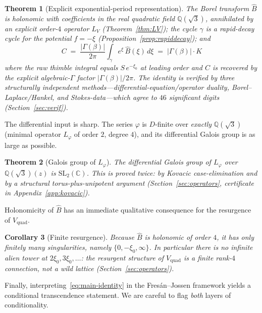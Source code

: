 \documentclass[11pt,reqno]{amsart}
\renewcommand{\_}{\vquadorigunderscore\allowbreak}
\theoremstyle{plain}
\newtheorem{theorem}{Theorem}[section]
\newtheorem{corollary}[theorem]{Corollary}
\theoremstyle{definition}
\newcommand{\Vquad}{V_{\mathrm{quad}}}
\newcommand{\Bhat}{\widehat{B}}
\newcommand{\Lphi}{L_{\varphi}}
\newcommand{\LV}{L_{V}}
\newcommand{\Qsqrt}{\mathbb{Q}(\sqrt3)}
\newcommand{\xizero}{\xi_0}
\newcommand{\SL}{\mathrm{SL}}
\providecommand{\C}{}\renewcommand{\C}{C}
\begin{document}
\begin{theorem}[Explicit exponential-period representation]\label{thm:main}
The Borel transform $\Bhat$ is holonomic with coefficients in the real quadratic field
$\Qsqrt$, annihilated by an explicit order-$4$ operator $\LV$ (Theorem~\ref{thm:LV}); the
cycle $\gamma$ is a rapid-decay cycle for the potential $f=-\xi$
(Proposition~\ref{prop:rapiddecay}); and
\begin{equation}\label{eq:main-identity}
  \boxed{\;\C\;=\;\frac{\lvert\Gamma(\beta)\rvert}{2\pi}\int_{\gamma} e^{\xi}\,\Bhat(\xi)\,d\xi
  \;=\;\lvert\Gamma(\beta)\rvert\cdot K\;}
\end{equation}
where the raw thimble integral equals $S\,e^{-\xizero}$ at leading order and $\C$ is recovered
by the explicit algebraic-$\Gamma$ factor $\lvert\Gamma(\beta)\rvert/2\pi$. The identity is
verified by three structurally independent methods---differential-equation/operator duality,
Borel--Laplace/Hankel, and Stokes-data---which agree to $46$ significant digits
(Section~\ref{sec:verif}).
\end{theorem}

The differential input is sharp. The series $\varphi$ is $D$-finite over \emph{exactly} $\Qsqrt$
(minimal operator $\Lphi$ of order $2$, degree $4$), and its differential Galois group is as
large as possible.

\begin{theorem}[Galois group of $\Lphi$]\label{thm:galois}
The differential Galois group of $\Lphi$ over $\Qsqrt(z)$ is $\SL_2(\mathbb{C})$. This is proved
twice: by Kovacic case-elimination and by a structural torus-plus-unipotent argument
(Section~\ref{sec:operators}, certificate in Appendix~\ref{app:kovacic}).
\end{theorem}

Holonomicity of $\Bhat$ has an immediate qualitative consequence for the resurgence of $\Vquad$.

\begin{corollary}[Finite resurgence]\label{cor:finite}
Because $\Bhat$ is holonomic of order $4$, it has only finitely many singularities, namely
$\{0,-\xizero,\infty\}$. In particular there is \emph{no} infinite alien tower at
$2\xizero,3\xizero,\dots$: the resurgent structure of $\Vquad$ is a finite rank-$4$ connection,
not a wild lattice (Section~\ref{sec:operators}).
\end{corollary}

Finally, interpreting~\eqref{eq:main-identity} in the Fres\'an--Jossen framework yields a
conditional transcendence statement. We are careful to flag \emph{both} layers of
conditionality.
\end{document}

